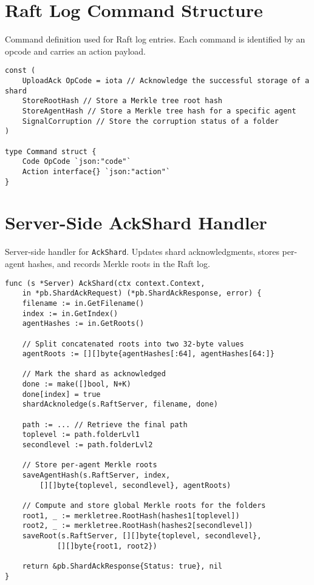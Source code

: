 \section{Raft Log Command Structure} \label{code:command-struct-for-raft}

\begin{listing}[H]
\caption{Command definition used for Raft log entries. Each command is identified by an opcode and carries an action payload.}
\begin{verbatim}
const (
    UploadAck OpCode = iota // Acknowledge the successful storage of a shard
    StoreRootHash // Store a Merkle tree root hash
    StoreAgentHash // Store a Merkle tree hash for a specific agent
    SignalCorruption // Store the corruption status of a folder
)

type Command struct {
    Code OpCode `json:"code"`
    Action interface{} `json:"action"`
}
\end{verbatim}
\end{listing}


\section{Server-Side AckShard Handler} \label{code:ack-shard}
\begin{listing}[H]
\caption{Server-side handler for \texttt{AckShard}. Updates shard acknowledgments, stores per-agent hashes, and records Merkle roots in the Raft log.}
\begin{verbatim}
func (s *Server) AckShard(ctx context.Context,
    in *pb.ShardAckRequest) (*pb.ShardAckResponse, error) {
    filename := in.GetFilename()
    index := in.GetIndex()
    agentHashes := in.GetRoots()

    // Split concatenated roots into two 32-byte values
    agentRoots := [][]byte{agentHashes[:64], agentHashes[64:]}

    // Mark the shard as acknowledged
    done := make([]bool, N+K)
    done[index] = true
    shardAcknoledge(s.RaftServer, filename, done)

    path := ... // Retrieve the final path
    toplevel := path.folderLvl1
    secondlevel := path.folderLvl2

    // Store per-agent Merkle roots
    saveAgentHash(s.RaftServer, index,
        [][]byte{toplevel, secondlevel}, agentRoots)

    // Compute and store global Merkle roots for the folders
    root1, _ := merkletree.RootHash(hashes1[toplevel])
    root2, _ := merkletree.RootHash(hashes2[secondlevel])
    saveRoot(s.RaftServer, [][]byte{toplevel, secondlevel},
            [][]byte{root1, root2})

    return &pb.ShardAckResponse{Status: true}, nil
}
\end{verbatim}
\end{listing}


